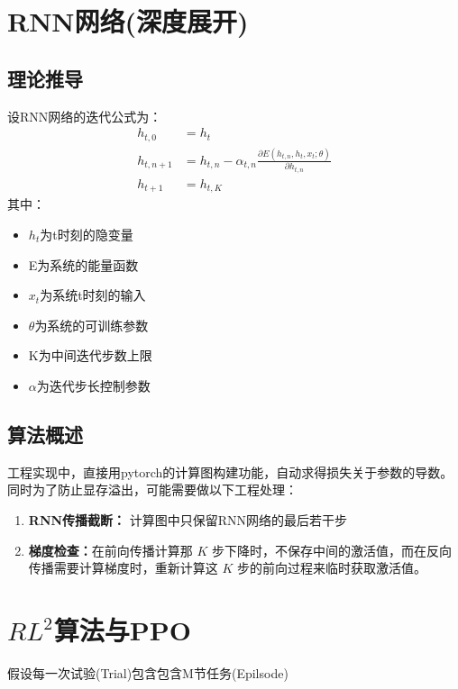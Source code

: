 \documentclass[UTF8]{ctexart}   %
\newcommand{\ptl}[2]{\frac{\partial #1}{\partial #2}}
\begin{document}
\section{RNN网络(深度展开)}

    \subsection{理论推导}
    设RNN网络的迭代公式为：
    \begin{align}
        h_{t, 0} &= h_t\\
        h_{t, n+1} &= h_{t, n} - \alpha_{t, n} \ptl{E(h_{t, n}, h_t, x_t;\theta)}{h_{t, n}}\\
        h_{t+1} &= h_{t, K}
    \end{align}
    其中：
        \begin{itemize}
            \item $h_t$为t时刻的隐变量
            \item E为系统的能量函数
            \item $x_t$为系统t时刻的输入
            \item $\theta$为系统的可训练参数
            \item K为中间迭代步数上限
            \item $\alpha$为迭代步长控制参数
        \end{itemize}

    \subsection{算法概述}
        工程实现中，直接用pytorch的计算图构建功能，自动求得损失关于参数的导数。
        同时为了防止显存溢出，可能需要做以下工程处理：
        \begin{enumerate}
            \item \textbf{RNN传播截断：} 计算图中只保留RNN网络的最后若干步
            \item \textbf{梯度检查：}在前向传播计算那 $K$ 步下降时，不保存中间的激活值，而在反向传播需要计算梯度时，重新计算这 $K$ 步的前向过程来临时获取激活值。
        \end{enumerate}


\section{$RL^2$算法与PPO}
    假设每一次试验(Trial)包含包含M节任务(Epilsode)
\end{document}
